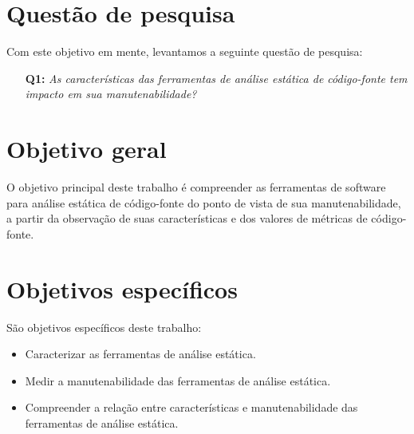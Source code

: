 %
%

\section{Questão de pesquisa}

Com este objetivo em mente, levantamos a seguinte questão de pesquisa:

\begin{enumerate}
  \item [{\bf Q1:}] {\em As características das ferramentas de análise estática
  de código-fonte tem impacto em sua manutenabilidade?}
\end{enumerate}

\section{Objetivo geral}

O objetivo principal deste trabalho é compreender as ferramentas de software
para análise estática de código-fonte do ponto de vista de sua
manutenabilidade, a partir da observação de suas características e dos valores
de métricas de código-fonte.

\section{Objetivos específicos}

São objetivos específicos deste trabalho:

\begin{itemize}
  \item Caracterizar as ferramentas de análise estática.
  \item Medir a manutenabilidade das ferramentas de análise estática.
  \item Compreender a relação entre características e manutenabilidade
        das ferramentas de análise estática.
\end{itemize}

